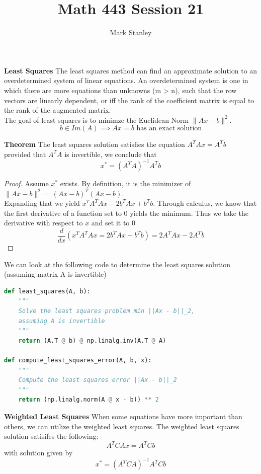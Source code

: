 \documentclass[11pt]{article}
\author{Mark Stanley}
\title{Math 443 Session 21}
\begin{document}
    \lstset{style=mystyle}

    \maketitle

    \textbf{Least Squares}
    The least squares method can find an approximate solution to an overdetermined system of linear equations.
    An overdetermined system is one in which there are more equations than unknowns (m > n), such that the row vectors
    are linearly dependent, or iff the rank of the coefficient matrix is equal to the rank of the augmented matrix.\\
    The goal of least squares is to minimze the Euclidean Norm $\|Ax-b\|^2$.\\
    \[b\in Im(A) \implies Ax=b \textrm{ has an exact solution}\]

    \textbf{Theorem}
    The least squares solution satisfies the equation $A^TAx = A^Tb$\\
    provided that $A^TA$ is invertible, we conclude that\\
    \[x^*=(A^TA)^{-1}A^Tb\]

    \begin{proof}
        Assume $x^*$ exists. By definition, it is the minimizer of $\|Ax-b\|^2=(Ax-b)^T(Ax-b)$.\\
        Expanding that we yield $x^{T}A^{T}Ax-2b^T Ax+b^T b$.
        Through calculus, we know that the first derivative of a function set to 0 yields the minimum. Thus
        we take the derivative with respect to $x$ and set it to 0\\
        \[\frac{d}{dx}(x^T A^T Ax = 2b^T Ax + b^T b)=2A^T Ax - 2A^T b\]
    \end{proof}

    We can look at the following code to determine the least squares solution (assuming matrix A is invertible)
    \begin{lstlisting}[language=Python]
    def least_squares(A, b):
    """
    Solve the least squares problem min ||Ax - b||_2,
    assuming A is invertible
    """
    return (A.T @ b) @ np.linalg.inv(A.T @ A)

def compute_least_squares_error(A, b, x):
    """
    Compute the least squares error ||Ax - b||_2
    """
    return (np.linalg.norm(A @ x - b)) ** 2
    \end{lstlisting}

    \textbf{Weighted Least Squares}
    When some equations have more important than others, we can utilize the weighted least squares.
    The weighted least squares solution satisifes the following:\\
    \[A^T CAx=A^T Cb\] with solution given by \[x^*=(A^T CA)^{-1}A^T Cb\]
\end{document}
